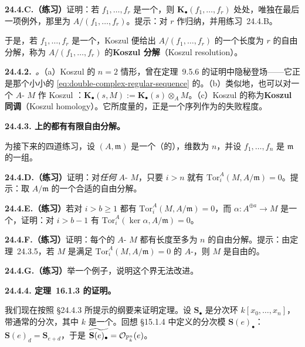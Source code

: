 \textbf{24.4.C.（练习）}\quad 证明：若 $f_1,\dots,f_r$ 是一个\trRegularSequence，则 $\mathbf{K}_\bullet(f_1,\dots,f_r)$ 处处\trExact，唯独在最后一项例外，那里\trCohomology{}为 $A/(f_1,\dots,f_r)$。提示：对 $r$ 作归纳，并用\mbox{练习~24.4.B}。

于是，若 $f_1,\dots,f_r$ 是一个\trRegularSequence，Koszul \trComplexN{}便给出 $A/(f_1,\dots,f_r)$ 的一个长度为 $r$ 的自由分解，称为 $A/(f_1,\dots,f_r)$ 的\textbf{Koszul 分解}（Koszul resolution）。

\textbf{24.4.2.}\ \emph{\trhRemark。}\quad （a）Koszul \trComplexN{}的 $n=2$ 情形，曾在\mbox{定理~9.5.6} 的证明中隐秘登场——它正是那个小小的\trDoubleComplex{} \eqref{eq:double-complex-regular-sequence} 的\trTotalComplex。（b）类似地，也可以对一个 $A$-\trModule{} $M$ 作 Koszul \trComplexN：$\mathbf{K}_\bullet(s,M):=\mathbf{K}_\bullet(s)\otimes_A M$。（c）Koszul \trComplexN{}的\trCohomology{}称为\textbf{Koszul 同调}（Koszul homology）。它所度量的，正是一个序列作为\trRegularSequence{}的失败程度。

\textbf{24.4.3. \trRegular\trLocalRing{}上的\trFinitelyGenerated{}\trModule{}都有有限自由分解。}

为接下来的四道练习，设 $(A,\mathfrak{m})$ 是一个（\trNoether{}的）\trRegular\trLocalRing，维数为 $n$，并设 $f_1,\dots,f_n$ 是 $\mathfrak{m}$ 的一组\trGenerators。

\textbf{24.4.D.（练习）}\quad 证明：对\emph{任何} $A$-\trModule{} $M$，只要 $i>n$ 就有 $\mathrm{Tor}_i^A(M,A/\mathfrak{m})=0$。提示：取 $A/\mathfrak{m}$ 的一个合适的自由分解。

\textbf{24.4.E.（练习）}\quad 若对 $i>b\ge 1$ 都有 $\mathrm{Tor}_i^A(M,A/\mathfrak{m})=0$，而 $\alpha\colon A^{\oplus a}\to M$ 是一个\trSurjectiveMap，证明：对 $i>b-1$ 有 $\mathrm{Tor}_i^A(\ker\alpha,A/\mathfrak{m})=0$。

\textbf{24.4.F.（练习）}\quad 证明：每个\trFinitelyGenerated{}的 $A$-\trModule{} $M$ 都有长度至多为 $n$ 的自由分解。提示：由\mbox{定理~24.3.5}，若 $M$ 是满足 $\mathrm{Tor}_i^A(M,A/\mathfrak{m})=0$ 的\trFinitelyGenerated{} $A$-\trModule，则 $M$ 是自由的。

\textbf{24.4.G.（练习）}\quad 举一个例子，说明这个界无法改进。

\textbf{24.4.4. \mbox{\trHilbert{}\trSyzygy{}定理~16.1.3} 的证明。}

我们现在按照 \S24.4.3 所提示的纲要来证明\trHilbert{}\trSyzygy{}定理。设 $\mathbf{S}_\bullet$ 是分次环 $k[x_0,\dots,x_n]$，带通常的分次，其中 $k$ 是一个\trField。回想 \S15.1.4 中定义的分次模 $\mathbf{S}(e)_\bullet$：$\mathbf{S}(e)_d=\mathbf{S}_{e+d}$，于是 $\widetilde{\mathbf{S}(e)_\bullet}=\mathcal{O}_{\mathbb{P}^n_k}(e)$。

